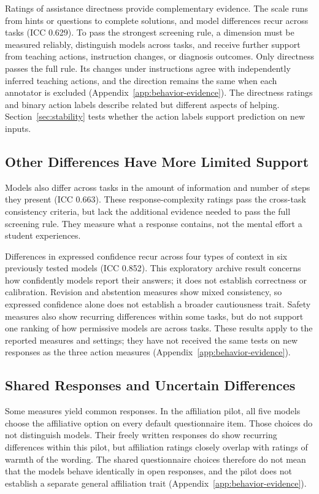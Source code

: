 Ratings of assistance directness provide complementary evidence. The scale
runs from hints or questions to complete solutions, and model differences
recur across tasks (ICC 0.629). To pass the strongest screening rule, a
dimension must be measured reliably, distinguish models across tasks, and
receive further support from teaching actions, instruction changes, or
diagnosis outcomes. Only directness passes the full rule. Its changes under
instructions agree with independently inferred teaching actions, and the
direction remains the same when each annotator is excluded
(Appendix~\ref{app:behavior-evidence}). The directness ratings and binary action
labels describe related but different aspects of helping. Section~\ref{sec:stability}
tests whether the action labels support prediction on new inputs.

\subsection{Other Differences Have More Limited Support}

Models also differ across tasks in the amount of information and number of
steps they present (ICC 0.663). These response-complexity ratings pass the
cross-task consistency criteria, but lack the additional evidence needed to
pass the full screening rule. They measure what a response contains, not the
mental effort a student experiences.

Differences in expressed confidence recur across four types of context in six
previously tested models (ICC 0.852). This
exploratory archive result concerns how confidently models report their
answers; it does not establish correctness or calibration. Revision and abstention measures show mixed consistency, so expressed
confidence alone does not establish a broader cautiousness trait. Safety measures also show recurring differences within some tasks, but do not
support one ranking of how permissive models are across tasks. These results
apply to the reported measures and settings; they have not received the same
tests on new responses as the three action measures (Appendix~\ref{app:behavior-evidence}).

\subsection{Shared Responses and Uncertain Differences}

Some measures yield common responses. In the affiliation pilot, all five models choose the affiliative option on
every default questionnaire item. Those choices do not distinguish models. Their freely written responses do show recurring differences within this
pilot, but affiliation ratings closely overlap with ratings of warmth of the wording.
The shared questionnaire choices therefore do not mean that the models behave
identically in open responses, and the pilot does not establish a separate
general affiliation trait (Appendix~\ref{app:behavior-evidence}).


